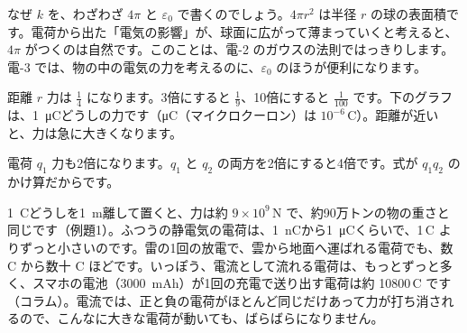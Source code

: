 \noindent なぜ $k$ を、わざわざ $4\pi$ と $\varepsilon_0$ で書くのでしょう。$4\pi r^2$ は半径 $r$ の球の表面積です。電荷から出た「電気の影響」が、球面に広がって薄まっていくと考えると、$4\pi$ がつくのは自然です。このことは、電-2 のガウスの法則ではっきりします。電-3 では、物の中の電気の力を考えるのに、$\varepsilon_0$ のほうが便利になります。

\begin{phbaisuru}{距離 $r$}
力は $\tfrac14$ になります。3倍にすると $\tfrac19$、10倍にすると $\tfrac{1}{100}$ です。下のグラフは、\qty{1}{\micro C}どうしの力です（\unit{\micro C}（マイクロクーロン）は $10^{-6}$\,C）。距離が近いと、力は急に大きくなります。
\par\smallskip\noindent{}
\end{phbaisuru}

\begin{phbaisuru}{電荷 $q_1$}
力も2倍になります。$q_1$ と $q_2$ の両方を2倍にすると4倍です。式が $q_1q_2$ のかけ算だからです。
\end{phbaisuru}

\begin{phmijika}[1\,C は、とても大きな電荷]
\qty{1}{C}どうしを\qty{1}{m}離して置くと、力は約 $9\times10^9$\,N で、約90万トンの物の重さと同じです（例題1）。ふつうの静電気の電荷は、\qty{1}{nC}から\qty{1}{\micro C}くらいで、1\,C よりずっと小さいのです。雷の1回の放電で、雲から地面へ運ばれる電荷でも、数 C から数十 C ほどです。いっぽう、電流として流れる電荷は、もっとずっと多く、スマホの電池（\qty{3000}{mAh}）が1回の充電で送り出す電荷は約 \num{10800}\,C です（コラム）。電流では、正と負の電荷がほとんど同じだけあって力が打ち消されるので、こんなに大きな電荷が動いても、ばらばらになりません。
\end{phmijika}

